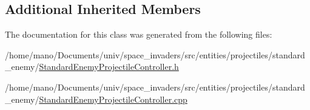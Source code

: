 \subsection*{Additional Inherited Members}


The documentation for this class was generated from the following files\+:\begin{DoxyCompactItemize}
\item 
/home/mano/\+Documents/univ/space\+\_\+invaders/src/entities/projectiles/standard\+\_\+enemy/\hyperlink{StandardEnemyProjectileController_8h}{Standard\+Enemy\+Projectile\+Controller.\+h}\item 
/home/mano/\+Documents/univ/space\+\_\+invaders/src/entities/projectiles/standard\+\_\+enemy/\hyperlink{StandardEnemyProjectileController_8cpp}{Standard\+Enemy\+Projectile\+Controller.\+cpp}\end{DoxyCompactItemize}
